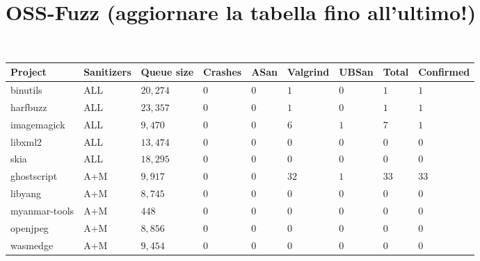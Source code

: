\section{OSS-Fuzz (aggiornare la tabella fino all'ultimo!)}
\ \\
\begin{adjustbox}{width=\textwidth,center}
\begin{tabular}{|l|l|l|l|l|l|l|l|l|}
\hline
\textbf{Project} & \textbf{Sanitizers} & \textbf{Queue size} & \textbf{Crashes} & \textbf{ASan} & \textbf{Valgrind} & \textbf{UBSan} & \textbf{Total} & \textbf{Confirmed}  \\ 
\hline
binutils         & ALL                 & $20,274$            & $0$              & $0$           & $1$           & $0$            & $1$             & $1$                 \\
harfbuzz         & ALL                 & $23,357$            & $0$              & $0$           & $1$           & $0$            & $1$             & $1$                 \\
imagemagick      & ALL                 & $9,470$             & $0$              & $0$           & $6$           & $1$            & $7$             & $1$                 \\
libxml2          & ALL                 & $13,474$            & $0$              & $0$           & $0$           & $0$            & $0$             & $0$                 \\
skia             & ALL                 & $18,295$            & $0$              & $0$           & $0$           & $0$            & $0$             & $0$                 \\ 
\hline
ghostscript      & A+M                 & $9,917$             & $0$              & $0$           & $32$          & $1$            & $33$            & $33$                \\
libyang          & A+M                 & $8,745$             & $0$              & $0$           & $0$           & $0$            & $0$             & $0$                 \\
myanmar-tools    & A+M                 & $448$               & $0$              & $0$           & $0$           & $0$            & $0$             & $0$                 \\
openjpeg         & A+M                 & $8,856$             & $0$              & $0$           & $0$           & $0$            & $0$             & $0$                 \\
wasmedge         & A+M                 & $9,454$             & $0$              & $0$           & $0$           & $0$            & $0$             & $0$                 \\ 

\end{tabular}
\end{adjustbox}
